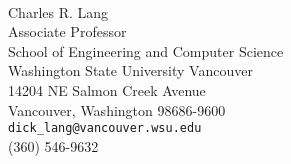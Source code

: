 \documentclass[10pt]{article}
\begin{document}





%


\vspace{0.25cm}

\\

Charles R. Lang\\ 
Associate Professor \\
School of Engineering and Computer Science \\
Washington State University Vancouver \\
14204 NE Salmon Creek Avenue \\
Vancouver, Washington 98686-9600 \\
\verb$dick_lang@vancouver.wsu.edu$ \\
(360) 546-9632\\
\end{document}
